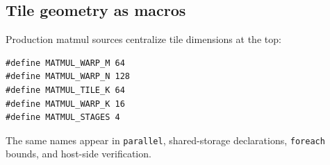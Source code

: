 \subsection*{Tile geometry as macros}

Production matmul sources centralize tile dimensions at the top:

\begin{lstlisting}[language=croqtile,caption={Tile geometry as macros}]
#define MATMUL_WARP_M 64
#define MATMUL_WARP_N 128
#define MATMUL_TILE_K 64
#define MATMUL_WARP_K 16
#define MATMUL_STAGES 4
\end{lstlisting}

The same names appear in \texttt{parallel}, shared-storage declarations, \texttt{foreach} bounds, and host-side verification.
